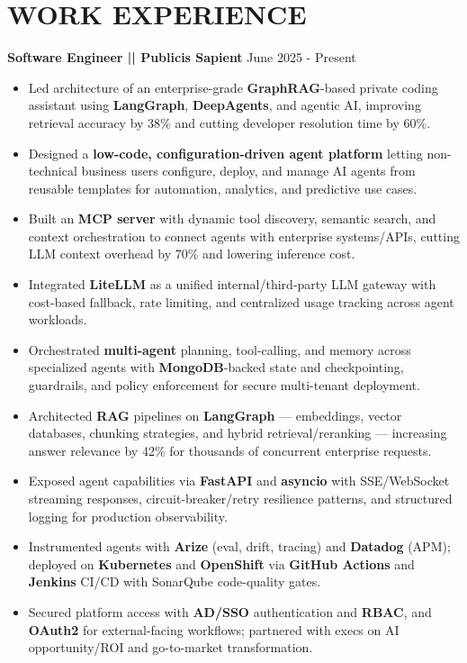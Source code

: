 \documentclass[a4paper]{article}
\begin{document}
\section*{WORK EXPERIENCE}
\textbf{Software Engineer || Publicis Sapient}
\hfill June 2025 - Present
\begin{itemize}
\vspace{1pt}
\item {Led architecture of an enterprise-grade \textbf{GraphRAG}-based private coding assistant using \textbf{LangGraph}, \textbf{DeepAgents}, and agentic AI, improving retrieval accuracy by 38\% and cutting developer resolution time by 60\%.}
\item {Designed a \textbf{low-code, configuration-driven agent platform} letting non-technical business users configure, deploy, and manage AI agents from reusable templates for automation, analytics, and predictive use cases.}
\item {Built an \textbf{MCP server} with dynamic tool discovery, semantic search, and context orchestration to connect agents with enterprise systems/APIs, cutting LLM context overhead by 70\% and lowering inference cost.}
\item {Integrated \textbf{LiteLLM} as a unified internal/third-party LLM gateway with cost-based fallback, rate limiting, and centralized usage tracking across agent workloads.}
\item {Orchestrated \textbf{multi-agent} planning, tool-calling, and memory across specialized agents with \textbf{MongoDB}-backed state and checkpointing, guardrails, and policy enforcement for secure multi-tenant deployment.}
\item {Architected \textbf{RAG} pipelines on \textbf{LangGraph} — embeddings, vector databases, chunking strategies, and hybrid retrieval/reranking — increasing answer relevance by 42\% for thousands of concurrent enterprise requests.}
\item {Exposed agent capabilities via \textbf{FastAPI} and \textbf{asyncio} with SSE/WebSocket streaming responses, circuit-breaker/retry resilience patterns, and structured logging for production observability.}
\item {Instrumented agents with \textbf{Arize} (eval, drift, tracing) and \textbf{Datadog} (APM); deployed on \textbf{Kubernetes} and \textbf{OpenShift} via \textbf{GitHub Actions} and \textbf{Jenkins} CI/CD with SonarQube code-quality gates.}
\item {Secured platform access with \textbf{AD/SSO} authentication and \textbf{RBAC}, and \textbf{OAuth2} for external-facing workflows; partnered with execs on AI opportunity/ROI and go-to-market transformation.}

\end{itemize}
\end{document}

